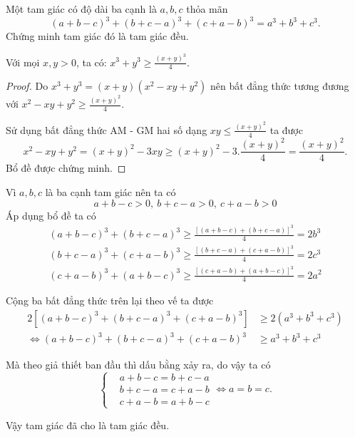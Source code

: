\begin{problem}
Một tam giác có độ dài ba cạnh là $a, b, c$ thỏa mãn
\[
	(a + b - c)^3 + (b + c - a)^3 + (c + a - b)^3 = a^3 + b^3 + c^3.
\]
Chứng minh tam giác đó là tam giác đều.

\solution

\begin{mybox}
\begin{lemma}
Với mọi $x, y > 0$, ta có: $\displaystyle x^3 + y^3 \ge \frac{(x + y)^3}{4}$.
\end{lemma}

\begin{proof}
Do $x^3 + y^3 = (x + y)(x^2 - xy + y^2)$ nên bất đẳng thức tương đương với $\displaystyle x^2 - xy + y^2 \ge \frac{(x + y)^2}{4}$.

Sử dụng bất đẳng thức AM - GM hai số dạng $\displaystyle xy \le \frac{(x + y)^2}{4}$ ta được
\[
	x^2 - xy + y^2 = (x + y)^2 - 3xy \ge (x + y)^2 - 3.\frac{(x + y)^2}{4} = \frac{(x + y)^2}{4}.
\]
Bổ đề được chứng minh.
\end{proof}
\end{mybox}

Vì $a, b, c$ là ba cạnh tam giác nên ta có
\[
	a + b - c > 0,\ b + c - a > 0,\ c + a - b > 0
\]
Áp dụng bổ đề ta có
\begin{align*}
	(a + b - c)^3 + (b + c - a)^3 \ge \frac{[(a + b - c) + (b + c - a)]^3}{4} = 2b^3 \\ 
	(b + c - a)^3 + (c + a - b)^3 \ge \frac{[(b + c - a) + (c + a - b)]^3}{4} = 2c^3 \\
	(c + a - b)^3 + (a + b - c)^3 \ge \frac{[(c + a - b) + (a + b - c)]^3}{4} = 2a^2
\end{align*}

Cộng ba bất đẳng thức trên lại theo vế ta được
\begin{align*}
	2[(a + b - c)^3 + (b + c - a)^3 + (c + a - b)^3] &\ge 2(a^3 + b^3 + c^3) \\ 
	\Leftrightarrow (a + b - c)^3 + (b + c - a)^3 + (c + a - b)^3 &\ge a^3 + b^3 + c^3
\end{align*}

Mà theo giả thiết ban đầu thì dấu bằng xảy ra, do vậy ta có
$$
\begin{cases}
	&a + b - c = b + c - a \\
	&b + c - a = c + a - b \\
	&c + a - b = a + b - c
\end{cases}
\Leftrightarrow a = b = c.
$$

Vậy tam giác đã cho là tam giác đều.
\end{problem}